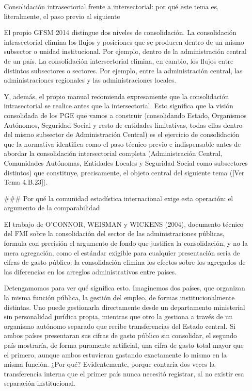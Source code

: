 \documentclass[10pt,a4paper]{article}
\newcommand{\authorfont}[1]{{\fontfamily{EBGaramond-TLF}\selectfont #1}}
\begin{document}
Consolidación intrasectorial frente a intersectorial: por qué este tema es, literalmente, el paso previo al siguiente

El propio GFSM 2014 distingue dos niveles de consolidación. La consolidación intrasectorial elimina los flujos y posiciones que se producen dentro de un mismo subsector o unidad institucional. Por ejemplo, dentro de la administración central de un país. La consolidación intersectorial elimina, en cambio, los flujos entre distintos subsectores o sectores. Por ejemplo, entre la administración central, las administraciones regionales y las administraciones locales. 

Y, además, el propio manual recomienda expresamente que la consolidación intrasectorial se realice antes que la intersectorial. Esto significa que la visión consolidada de los PGE que vamos a construir (consolidando Estado, Organismos Autónomos, Seguridad Social y resto de entidades limitativas, todas ellas dentro del mismo subsector de Administración Central) es el ejercicio de consolidación que la normativa identifica como el paso técnico previo e indispensable antes de abordar la consolidación intersectorial completa (Administración Central, Comunidades Autónomas, Entidades Locales y Seguridad Social como subsectores distintos) que constituye, precisamente, el objeto central del siguiente tema ([\authorfont{Ver Tema 4.B.23}]). 

### Por qué la comunidad estadística internacional exige esta operación: el argumento de la comparabilidad

El trabajo de O'CONNOR, WEISMAN y WICKENS (2004), documento técnico del FMI sobre la consolidación del sector de las administraciones públicas, formula con precisión el argumento de fondo que justifica la consolidación, y no la mera agregación, como el estándar exigible para cualquier presentación seria de cifras de gasto público: la consolidación elimina los efectos sobre los agregados de las diferencias en los arreglos administrativos entre países. 

Detengamomos para ver qué significa esto. Imaginemos dos países, que organizan la misma función pública, la gestión del empleo, de formas institucionalmente distintas. Uno puede gestionarla directamente desde un departamento ministerial sin personalidad jurídica propia, mientras que otro la gestiona a través de un organismo autónomo separado que recibe transferencias del Estado central. Si ambos países presentaran sus cifras de gasto público sin consolidar, el segundo país mostraría, de forma puramente artificial, una cifra de gasto total mayor que el primero, aunque ambos estuvieran gastando exactamente lo mismo en la misma función. ¿Por qué? Evidentemente, porque contaría dos veces la transferencia interna que el primer país nunca necesitó registrar, al no existir esa separación institucional. 
\end{document}
